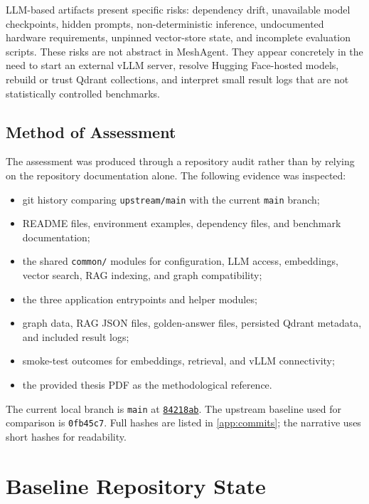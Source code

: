 \documentclass[11pt,a4paper]{article}
\newcommand{\repo}{MeshAgent}
\newcommand{\commit}[1]{\texttt{#1}}
\newcommand{\commitlink}[2]{\href{https://github.com/Echeva26/MeshAgent/commit/#2}{\commit{#1}}}
\begin{document}
LLM-based artifacts present specific risks: dependency drift, unavailable model checkpoints, hidden prompts, non-deterministic inference, undocumented hardware requirements, unpinned vector-store state, and incomplete evaluation scripts. These risks are not abstract in \repo{}. They appear concretely in the need to start an external vLLM server, resolve Hugging Face-hosted models, rebuild or trust Qdrant collections, and interpret small result logs that are not statistically controlled benchmarks.

\subsection{Method of Assessment}

The assessment was produced through a repository audit rather than by relying on the repository documentation alone. The following evidence was inspected:

\begin{itemize}
  \item git history comparing \texttt{upstream/main} with the current \texttt{main} branch;
  \item README files, environment examples, dependency files, and benchmark documentation;
  \item the shared \texttt{common/} modules for configuration, LLM access, embeddings, vector search, RAG indexing, and graph compatibility;
  \item the three application entrypoints and helper modules;
  \item graph data, RAG JSON files, golden-answer files, persisted Qdrant metadata, and included result logs;
  \item smoke-test outcomes for embeddings, retrieval, and vLLM connectivity;
  \item the provided thesis PDF as the methodological reference.
\end{itemize}

\begin{evidencebox}
The current local branch is \texttt{main} at \commitlink{84218ab}{84218abadccb2a5f855f5bef4dcbe07b53af996a}. The upstream baseline used for comparison is \commit{0fb45c7}. Full hashes are listed in \cref{app:commits}; the narrative uses short hashes for readability.
\end{evidencebox}

\section{Baseline Repository State}
\end{document}
